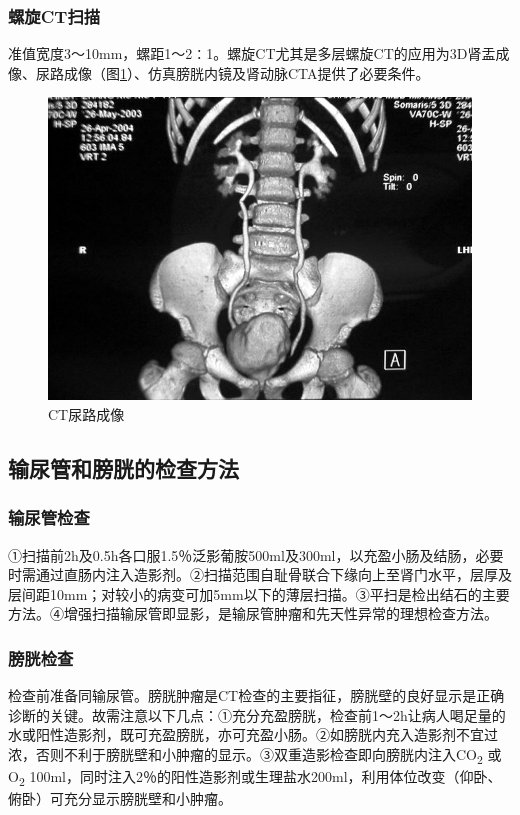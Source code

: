 \subsubsection{螺旋CT扫描}

准值宽度3～10mm，螺距1～2∶1。螺旋CT尤其是多层螺旋CT的应用为3D肾盂成像、尿路成像（图\ref{fig15-1}）、仿真膀胱内镜及肾动脉CTA提供了必要条件。

\begin{figure}[!htbp]
 \centering
 \includegraphics[width=.7\textwidth,height=\textheight,keepaspectratio]{./images/Image00316.jpg}
 \captionsetup{justification=centering}
 \caption{CT尿路成像}
 \label{fig15-1}
  \end{figure} 

\subsection{输尿管和膀胱的检查方法}

\subsubsection{输尿管检查}

①扫描前2h及0.5h各口服1.5％泛影葡胺500ml及300ml，以充盈小肠及结肠，必要时需通过直肠内注入造影剂。②扫描范围自耻骨联合下缘向上至肾门水平，层厚及层间距10mm；对较小的病变可加5mm以下的薄层扫描。③平扫是检出结石的主要方法。④增强扫描输尿管即显影，是输尿管肿瘤和先天性异常的理想检查方法。

\subsubsection{膀胱检查}

检查前准备同输尿管。膀胱肿瘤是CT检查的主要指征，膀胱壁的良好显示是正确诊断的关键。故需注意以下几点：①充分充盈膀胱，检查前1～2h让病人喝足量的水或阳性造影剂，既可充盈膀胱，亦可充盈小肠。②如膀胱内充入造影剂不宜过浓，否则不利于膀胱壁和小肿瘤的显示。③双重造影检查即向膀胱内注入CO\textsubscript{2}
或O\textsubscript{2}
100ml，同时注入2％的阳性造影剂或生理盐水200ml，利用体位改变（仰卧、俯卧）可充分显示膀胱壁和小肿瘤。

